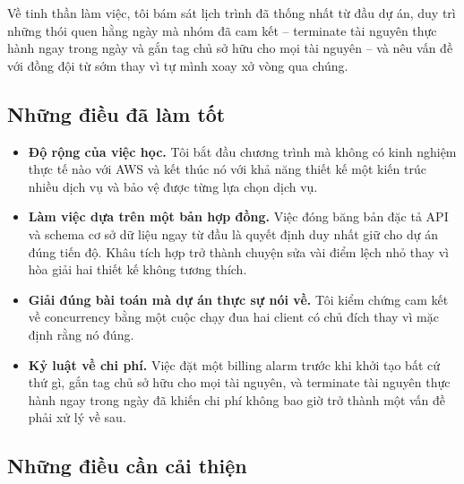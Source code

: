 Về tinh thần làm việc, tôi bám sát lịch trình đã thống nhất từ đầu dự án, duy
trì những thói quen hằng ngày mà nhóm đã cam kết -- terminate tài nguyên thực
hành ngay trong ngày và gắn tag chủ sở hữu cho mọi tài nguyên -- và nêu vấn đề
với đồng đội từ sớm thay vì tự mình xoay xở vòng qua chúng.

\subsection{Những điều đã làm tốt}

\begin{itemize}
    \setlength\itemsep{0.2em}
    \item \textbf{Độ rộng của việc học.} Tôi bắt đầu chương trình mà không có
    kinh nghiệm thực tế nào với AWS và kết thúc nó với khả năng thiết kế một
    kiến trúc nhiều dịch vụ và bảo vệ được từng lựa chọn dịch vụ.

    \item \textbf{Làm việc dựa trên một bản hợp đồng.} Việc đóng băng bản đặc tả
    API và schema cơ sở dữ liệu ngay từ đầu là quyết định duy nhất giữ cho dự án
    đúng tiến độ. Khâu tích hợp trở thành chuyện sửa vài điểm lệch nhỏ thay vì
    hòa giải hai thiết kế không tương thích.

    \item \textbf{Giải đúng bài toán mà dự án thực sự nói về.} Tôi kiểm chứng
    cam kết về concurrency bằng một cuộc chạy đua hai client có chủ đích thay vì
    mặc định rằng nó đúng.

    \item \textbf{Kỷ luật về chi phí.} Việc đặt một billing alarm trước khi khởi
    tạo bất cứ thứ gì, gắn tag chủ sở hữu cho mọi tài nguyên, và terminate tài
    nguyên thực hành ngay trong ngày đã khiến chi phí không bao giờ trở thành
    một vấn đề phải xử lý về sau.
\end{itemize}

\subsection{Những điều cần cải thiện}

